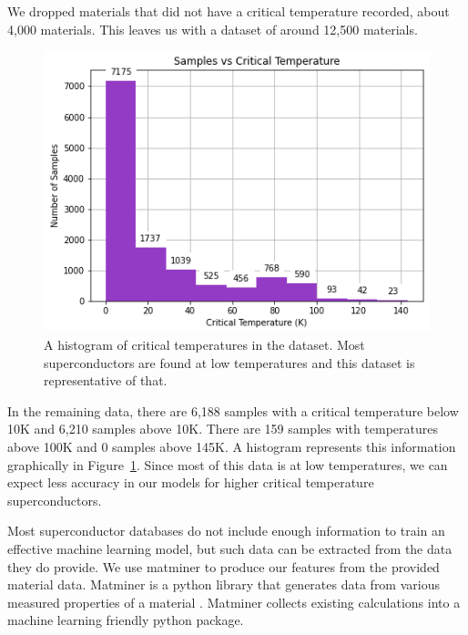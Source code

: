 \documentclass[twocolumn, nofootinbib, secnumarabic, amssymb, nobibnotes, aps, prd]{revtex4-2}
\begin{document}
We dropped materials that did not have a critical temperature recorded, about 4,000 materials. This leaves us with a dataset of around 12,500 materials. %

\begin{figure}[!h]
   \centering %
   \includegraphics[width=\columnwidth]{images/dataset_histogram.png}
   \caption{A histogram of critical temperatures in the dataset. Most superconductors are found at low temperatures and this dataset is representative of that.} %
   \label{fig:data-histogram}
\end{figure} %

In the remaining data, there are 6,188 samples with a critical temperature below 10K and 6,210 samples above 10K. There are 159 samples with temperatures above 100K and 0 samples above 145K. A histogram represents this information graphically in Figure~\ref{fig:data-histogram}. Since most of this data is at low temperatures, we can expect less accuracy in our models for higher critical temperature superconductors.

Most superconductor databases do not include enough information to train an effective machine learning model, but such data can be extracted from the data they do provide. We use matminer to produce our features from the provided material data. Matminer is a python library that generates data from various measured properties of a material \cite{WARD201860}. Matminer collects existing calculations into a machine learning friendly python package. %
\end{document}
